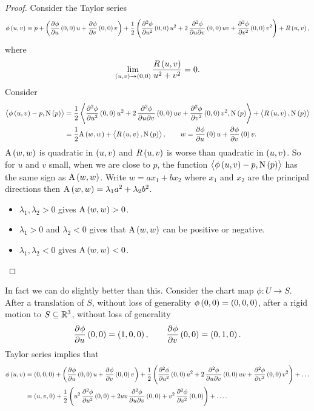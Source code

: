 \begin{proof}
Consider the Taylor series
$$ \phi\br{u, v} = p + \br{\dpd{\phi}{u}\br{0, 0}u + \dpd{\phi}{v}\br{0, 0}v} + \dfrac{1}{2}\br{\dpd[2]{\phi}{u}\br{0, 0}u^2 + 2\dmd{\phi}{2}{u}{}{v}{}\br{0, 0}uv + \dpd[2]{\phi}{v}\br{0, 0}v^2} + R\br{u, v}, $$
where
$$ \lim_{\br{u, v} \to \br{0, 0}} \dfrac{R\br{u, v}}{u^2 + v^2} = 0. $$
Consider
\begin{align*}
\abr{\phi\br{u, v} - p, \N\br{p}}
& = \dfrac{1}{2}\abr{\dpd[2]{\phi}{u}\br{0, 0}u^2 + 2\dmd{\phi}{2}{u}{}{v}{}\br{0, 0}uv + \dpd[2]{\phi}{v}\br{0, 0}v^2, \N\br{p}} + \abr{R\br{u, v}, \N\br{p}} \\
& = \dfrac{1}{2}\A\br{w, w} + \abr{R\br{u, v}, \N\br{p}}, \qquad w = \dpd{\phi}{u}\br{0}u + \dpd{\phi}{v}\br{0}v.
\end{align*}
$ \A\br{w, w} $ is quadratic in $ \br{u, v} $ and $ R\br{u, v} $ is worse than quadratic in $ \br{u, v} $. So for $ u $ and $ v $ small, when we are close to $ p $, the function $ \abr{\phi\br{u, v} - p, \N\br{p}} $ has the same sign as $ \A\br{w, w} $. Write $ w = ax_1 + bx_2 $ where $ x_1 $ and $ x_2 $ are the principal directions then $ \A\br{w, w} = \lambda_1a^2 + \lambda_2b^2 $.
\begin{itemize}
\item $ \lambda_1, \lambda_2 > 0 $ gives $ \A\br{w, w} > 0 $.
\item $ \lambda_1 > 0 $ and $ \lambda_2 < 0 $ gives that $ \A\br{w, w} $ can be positive or negative.
\item $ \lambda_1, \lambda_2 < 0 $ gives $ \A\br{w, w} < 0 $.
\end{itemize}
\end{proof}

In fact we can do slightly better than this. Consider the chart map $ \phi : U \to S $. After a translation of $ S $, without loss of generality $ \phi\br{0, 0} = \br{0, 0, 0} $, after a rigid motion to $ S \subseteq \mathbb{R}^3 $, without loss of generality
$$ \dpd{\phi}{u}\br{0, 0} = \br{1, 0, 0}, \qquad \dpd{\phi}{v}\br{0, 0} = \br{0, 1, 0}. $$
Taylor series implies that
\begin{align*}
\phi\br{u, v}
& = \br{0, 0, 0} + \br{\dpd{\phi}{u}\br{0, 0}u + \dpd{\phi}{v}\br{0, 0}v} + \dfrac{1}{2}\br{\dpd[2]{\phi}{u}\br{0, 0}u^2 + 2\dmd{\phi}{2}{u}{}{v}{}\br{0, 0}uv + \dpd[2]{\phi}{v}\br{0, 0}v^2} + \dots \\
& = \br{u, v, 0} + \dfrac{1}{2}\br{u^2\dpd[2]{\phi}{u}\br{0, 0} + 2uv\dmd{\phi}{2}{u}{}{v}{}\br{0, 0} + v^2\dpd[2]{\phi}{v}\br{0, 0}} + \dots.
\end{align*}

